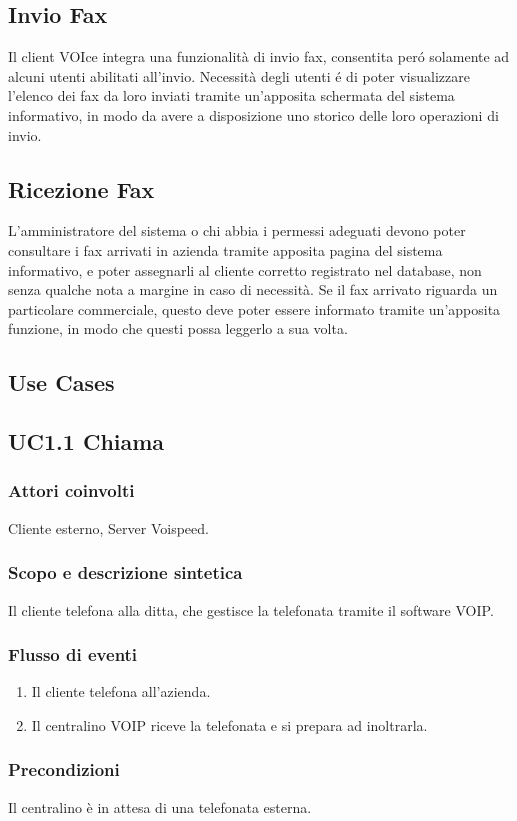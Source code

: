 \subsection{Invio Fax}
Il client VOIce integra una funzionalit\`a di invio fax, consentita per\'o solamente ad alcuni utenti abilitati all'invio. 
Necessit\`a degli utenti \'e di poter visualizzare l'elenco dei fax da loro inviati tramite un'apposita schermata del sistema
informativo, in modo da avere a disposizione uno storico delle loro operazioni di invio.
\subsection{Ricezione Fax}
L'amministratore del sistema o chi abbia i permessi adeguati devono poter consultare i fax arrivati in azienda tramite
apposita pagina del sistema informativo, e poter assegnarli al cliente corretto registrato nel database, non senza qualche nota
a margine in caso di necessit\`a. Se il fax arrivato riguarda un particolare commerciale, questo deve poter essere informato
 tramite un'apposita funzione, in modo che questi possa leggerlo a sua volta.
\subsection{Use Cases}
\subsection*{UC1.1 Chiama}
\subsubsection*{Attori coinvolti} Cliente esterno, Server Voispeed.
\subsubsection*{Scopo e descrizione sintetica}
Il cliente telefona alla ditta, che gestisce la telefonata tramite il software VOIP.
\subsubsection*{Flusso di eventi}
\begin{enumerate}
\item Il cliente telefona all'azienda.
\item Il centralino VOIP riceve la telefonata e si prepara ad inoltrarla.
\end{enumerate}
\subsubsection*{Precondizioni}  Il centralino \` e in attesa di una telefonata esterna.
